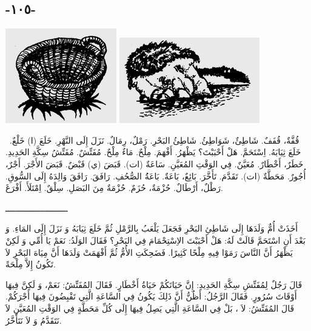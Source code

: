 \documentclass[a5paper]{article}
\begin{document}
\subsection[-١٠٥-]{-١٠٥-}
 \includegraphics[width=1.9063in,height=1.6252in]{MuhammadBagauddinlatinized-img278.png}   \includegraphics[width=2.4063in,height=1.4689in]{MuhammadBagauddinlatinized-img279.png} 

\ قُفَّةٌ، قُفَفٌ. شَاطِئٌ، شَوَاطِئُ. شَاطِئُ البَحْرِ. رَمْلٌ، رِمَالٌ. نَزَلَ إِلَى النَّهْرِ. خَلَعَ (ا) خَلْعٌ. خَلَعَ ثِيَابَهُ. اِسْتَحَمَّ. هَلْ أَحْبَبْتَ؟ يَظْهَرُ. أَفْهَمَ. مِلْحٌ. مَاءٌ مِلْحٌ. مُفَتِّشٌ. مُفَتِّشُ سِكَّةِ الحَدِيدِ. خَطَرٌ، أَخْطَارٌ. مُعَيَّنٌ. فِي الوَقْتِ المُعَيَّنِ. سَاعَةٌ (ات). قَبَضَ (ي) قَبْضٌ. قَبَضَ الأَجْرَ. أَجْرٌ، أُجُورٌ. مَحَطَّةٌ (ات). تَقَدَّمَ. تَأَخَّرَ. بَائِعٌ، بَاعَةٌ. بَاعَةُُ الصُّحُفِ. رَافَقَ. رَافَقَ وَالِدَهُ إِلَى السُّوقِ. رَطْلٌ، أَرْطَالٌ. حُزْمَةٌ، حُزَمٌ. حُزْمَةٌ مِنَ البَصَلِ. سِلْقٌ. اِمْتَلَأَ. أَفْرَغَ.

ـــــــــــــــــــــــــ

أَخَذَتْ أُمٌّ وَلَدَهَا إِلَى شَاطِئِ البَحْرِ فَجَعَلَ يَلْعَبُ بِالرَّمْلِ ثُمَّ خَلَعَ ثِيَابَهُ وَ نَزَلَ إِلَى المَاءِ. وَ بَعْدَ أَنِ اسْتَحَمَّ قَالَتْ لَهُ: هَلْ أَحْبَبْتَ الاِسْتِحْمَامَ فِي البَحْرِ؟ فَقَالَ الوَلَدُ: نَعَمْ يَا أُمِّي وَ لَكِنْ يَظْهَرُ أَنَّ النَّاسَ رَمَوْا فِيهِ مِلْحًا كَثِيرًا. فَضَحِكَتِ الأُمُّ ثُمَّ أَفْهَمَتْ وَلَدَهَا أَنَّ مِيَاهَ البَحْرِ لاَ تَكُونُ إِلاَّ مِلْحَةً.

قَالَ رَجُلٌ لِمُفَتِّشِ سِكَّةِ الحَدِيدِ: إِنَّ حَيَاتَكُمْ حَيَاةُ أَخْطَارٍ. فَقَالَ المُفَتِّشُ: نَعَمْ، وَ لَكِنَّ فِيهَا أَوْقَاتَ سُرُورٍ. فَقَالَ الرَّجُلُ: أَظُنُّ أَنَّ ذَلِكَ يَكُونُ فِي السَّاعَةِ الَّتِي تَقْبِضُونَ فِيهَا أَجْرَكُمْ. قَالَ المُفَتِّشُ: لاَ ، بَلْ فِي السَّاعَةِ الَّتِي يَصِلُ فِيهَا إِلَى كُلِّ مَحَطَّةٍ فِي الوَقْتِ المُعَيَّنِ لاَ نَتَقَدَّمُ وَ لاَ نَتَأَخَّرُ.
\end{document}
